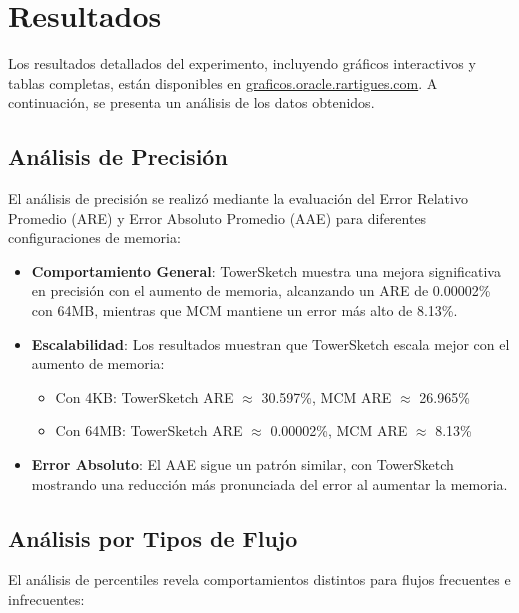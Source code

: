 \documentclass[a4paper,12pt]{article}
\begin{document}
\newpage 
\section{Resultados}

Los resultados detallados del experimento, incluyendo gráficos interactivos y tablas completas, están disponibles en \url{graficos.oracle.rartigues.com}. A continuación, se presenta un análisis de los datos obtenidos.

\subsection{Análisis de Precisión}
\noindent El análisis de precisión se realizó mediante la evaluación del Error Relativo Promedio (ARE) y Error Absoluto Promedio (AAE) para diferentes configuraciones de memoria:

\begin{itemize}
    \item \textbf{Comportamiento General}: TowerSketch muestra una mejora significativa en precisión con el aumento de memoria, alcanzando un ARE de 0.00002\% con 64MB, mientras que MCM mantiene un error más alto de 8.13\%.
    
    \item \textbf{Escalabilidad}: Los resultados muestran que TowerSketch escala mejor con el aumento de memoria:
\begin{itemize}
    \item Con 4KB: TowerSketch ARE $\approx$ 30.597\%, MCM ARE $\approx$ 26.965\%
    \item Con 64MB: TowerSketch ARE $\approx$ 0.00002\%, MCM ARE $\approx$ 8.13\%
\end{itemize}

\item \textbf{Error Absoluto}: El AAE sigue un patrón similar, con TowerSketch mostrando una reducción más pronunciada del error al aumentar la memoria.
\end{itemize}

\subsection{Análisis por Tipos de Flujo}
El análisis de percentiles revela comportamientos distintos para flujos frecuentes e infrecuentes:
\end{document}
